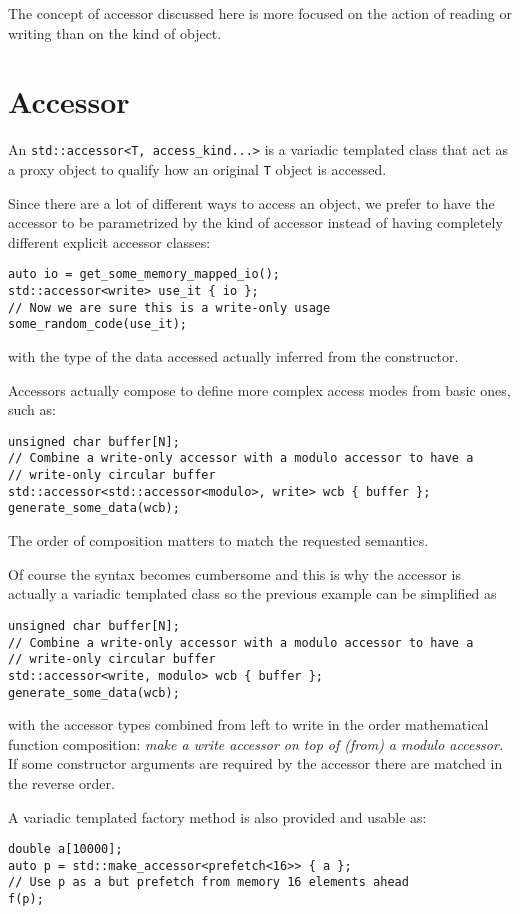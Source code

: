 \documentclass[a4paper]{article}
\begin{document}
The concept of accessor discussed here is more focused on the action
of reading or writing than on the kind of object.


\section{Accessor}
\label{sec:accessor}

An \lstinline|std::accessor<T, access_kind...>| is a variadic
templated class that act as a proxy object to qualify how an original
\lstinline|T| object is accessed.

Since there are a lot of different ways to access an object, we prefer
to have the accessor to be parametrized by the kind of accessor
instead of having completely different explicit accessor classes:
\begin{lstlisting}
auto io = get_some_memory_mapped_io();
std::accessor<write> use_it { io };
// Now we are sure this is a write-only usage
some_random_code(use_it);
\end{lstlisting}
with the type of the data accessed actually inferred from the
constructor.

Accessors actually compose to define more complex access modes from
basic ones, such as:
\begin{lstlisting}
unsigned char buffer[N];
// Combine a write-only accessor with a modulo accessor to have a
// write-only circular buffer
std::accessor<std::accessor<modulo>, write> wcb { buffer };
generate_some_data(wcb);
\end{lstlisting}
The order of composition matters to match the requested semantics.

Of course the syntax becomes cumbersome and this is why the accessor
is actually a variadic templated class so the previous example can be
simplified as
\begin{lstlisting}
unsigned char buffer[N];
// Combine a write-only accessor with a modulo accessor to have a
// write-only circular buffer
std::accessor<write, modulo> wcb { buffer };
generate_some_data(wcb);
\end{lstlisting}
with the accessor types combined from left to write in the order
mathematical function composition: \emph{make a write accessor on top
  of (from) a modulo accessor.} If some constructor arguments are
required by the accessor there are matched in the reverse order.

A variadic templated factory method is also provided and usable as:
\begin{lstlisting}
double a[10000];
auto p = std::make_accessor<prefetch<16>> { a };
// Use p as a but prefetch from memory 16 elements ahead
f(p);
\end{lstlisting}
\end{document}
